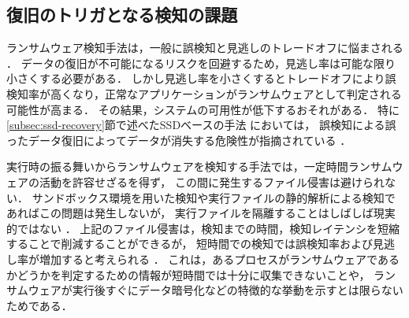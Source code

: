 
\subsection{復旧のトリガとなる検知の課題}
ランサムウェア検知手法は，一般に誤検知と見逃しのトレードオフに悩まされる \cite{Evolution-Ransomware,berrueta2019survey, mitigation-modern}．
データの復旧が不可能になるリスクを回避するため，見逃し率は可能な限り小さくする必要がある．
しかし見逃し率を小さくするとトレードオフにより誤検知率が高くなり，正常なアプリケーションがランサムウェアとして判定される可能性が高まる．
その結果，システムの可用性が低下するおそれがある．
特に\ref{subsec:ssd-recovery}節で述べたSSDベースの手法 \cite{huang2017flashguard,baek2018ssd} においては，
誤検知による誤ったデータ復旧によってデータが消失する危険性が指摘されている \cite{css2024-enomoto}．

実行時の振る舞いからランサムウェアを検知する手法では，一定時間ランサムウェアの活動を許容せざるを得ず，
この間に発生するファイル侵害は避けられない．
サンドボックス環境を用いた検知や実行ファイルの静的解析による検知であればこの問題は発生しないが，
実行ファイルを隔離することはしばしば現実的ではない \cite{shieldFS}．
上記のファイル侵害は，検知までの時間，検知レイテンシを短縮することで削減することができるが，
短時間での検知では誤検知率および見逃し率が増加すると考えられる \cite{mitigation-modern}．
これは，あるプロセスがランサムウェアであるかどうかを判定するための情報が短時間では十分に収集できないことや，
ランサムウェアが実行後すぐにデータ暗号化などの特徴的な挙動を示すとは限らないためである．
